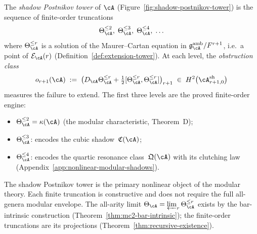 \begin{definition}
\label{def:shadow-postnikov-tower}
\ClaimStatusProvedHere
{}
The \emph{shadow Postnikov tower} of $\cA$
\textup{(}Figure~\textup{\ref{fig:shadow-postnikov-tower})}
is the sequence of
finite-order truncations
\begin{equation}
\label{eq:shadow-postnikov-tower}
\Theta_{\cA}^{\leq 2},\;
\Theta_{\cA}^{\leq 3},\;
\Theta_{\cA}^{\leq 4},\;
\ldots
\end{equation}
where $\Theta_{\cA}^{\leq r}$ is a solution
of the Maurer--Cartan equation in
$\mathfrak{g}^{\mathrm{amb}}_{\cA}/F^{r+1}$,
i.e.\ a point of $\mathcal{E}_{\cA}(r)$
(Definition~\ref{def:extension-tower}).
At each level, the \emph{obstruction class}
\begin{equation}
\label{eq:obstruction-class}
o_{r+1}(\cA)
\;:=\;
\bigl(
D_{\cA}\Theta_{\cA}^{\leq r}
+ \tfrac12[\Theta_{\cA}^{\leq r},\Theta_{\cA}^{\leq r}]
\bigr)_{r+1}
\;\in\;
H^2\bigl(\cA^{\mathrm{sh}}_{r+1,0}\bigr)
\end{equation}
measures the failure to extend.  The first three levels
are the proved finite-order engine:
\begin{itemize}
\item $\Theta_{\cA}^{\leq 2} = \kappa(\cA)$
  \quad(the modular characteristic, Theorem~D);
\item $\Theta_{\cA}^{\leq 3}$: encodes the cubic
  shadow~$\mathfrak{C}(\cA)$;
\item $\Theta_{\cA}^{\leq 4}$: encodes the quartic resonance
  class~$\mathfrak{Q}(\cA)$ with its clutching law
  (Appendix~\ref{app:nonlinear-modular-shadows}).
\end{itemize}
The shadow Postnikov tower is the primary nonlinear object of
the modular theory.  Each finite truncation is constructive and
does not require the full all-genera modular envelope.  The
all-arity limit
$\Theta_{\cA} = \varprojlim_r \Theta_{\cA}^{\leq r}$
exists by the bar-intrinsic construction
(Theorem~\ref{thm:mc2-bar-intrinsic}); the finite-order
truncations are its projections
(Theorem~\ref{thm:recursive-existence}).
\end{definition}

